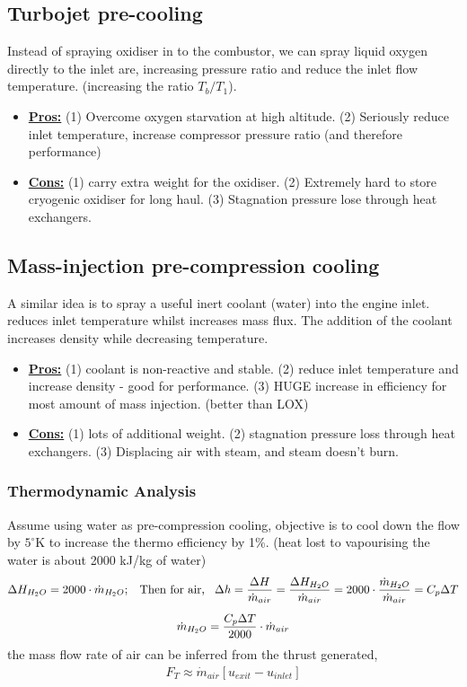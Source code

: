 \documentclass[a4paper,10pt]{article}
\begin{document}
\subsection{Turbojet pre-cooling}
Instead of spraying oxidiser in to the combustor, we can spray liquid oxygen directly to the inlet are, increasing pressure ratio and reduce the inlet flow temperature. (increasing the ratio $T_b/T_1$).
\begin{itemize}
    \item \underline{\textbf{Pros:}} (1) Overcome oxygen starvation at high altitude. (2) Seriously reduce inlet temperature, increase compressor pressure ratio (and therefore performance)
    \item \underline{\textbf{Cons:}} (1) carry extra weight for the oxidiser. (2) Extremely hard to store cryogenic oxidiser for long haul. (3) Stagnation pressure lose through heat exchangers. 
\end{itemize}

\subsection{Mass-injection pre-compression cooling}
A similar idea is to spray a useful inert coolant (water) into the engine inlet. reduces inlet temperature whilst increases mass flux. The addition of the coolant increases density while decreasing temperature. 
\begin{itemize}
    \item \underline{\textbf{Pros:}} (1) coolant is non-reactive and stable. (2) reduce inlet temperature and increase density - good for performance. (3) HUGE increase in efficiency for most amount of mass injection. (better than LOX)
    \item \underline{\textbf{Cons:}} (1) lots of additional weight. (2) stagnation pressure loss through heat exchangers. (3) Displacing air with steam, and steam doesn't burn.
\end{itemize}
\subsubsection{Thermodynamic Analysis}
Assume using water as pre-compression cooling, objective is to cool down the flow by $5^{\circ}$K to increase the thermo efficiency by 1\%. (heat lost to vapourising the water is about 2000 kJ/kg of water)
\begin{gather*}
    \Delta H_{H_2O} = 2000\cdot\dot{m}_{H_2O};\hspace*{0.3cm}\text{Then for air,}\hspace*{0.3cm}\Delta h = \frac{\Delta H}{\dot{m}_{air}} = \frac{\Delta H_{H_2O}}{\dot{m}_{air}} = 2000\cdot\frac{\dot{m}_{H_2O}}{\dot{m}_{air}} = C_p\Delta T\\[0.2cm]
    \dot{m}_{H_2O} = \frac{C_p\Delta T}{2000}\cdot\dot{m}_{air}
\end{gather*}
the mass flow rate of air can be inferred from the thrust generated, 
\begin{gather*}
    F_T\approx\dot{m}_{air}[u_{exit}-u_{inlet}]
\end{gather*}
\end{document}
